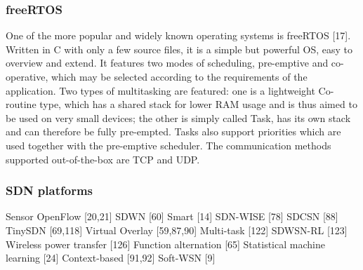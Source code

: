 \subsubsection{freeRTOS}

One of the more popular and widely known operating systems is freeRTOS [17].
Written in C with only a few source files,
	it is a simple but powerful OS,
	easy to overview and extend.
It features two modes of scheduling,
	pre-emptive and co-operative,
	which may be selected according to the requirements of the application.
Two types of multitasking are featured:
	one is a lightweight Co-routine type,
	which has a shared stack for lower RAM usage and is thus aimed to be used on very small devices;
	the other is simply called Task,
	has its own stack and can therefore be fully pre-empted.
Tasks also support priorities which are used together with the pre-emptive scheduler.
The communication methods supported out-of-the-box are TCP and UDP.

\subsubsection{SDN platforms}

Sensor OpenFlow [20,21]
SDWN [60]
Smart [14]
SDN-WISE [78]
SDCSN [88]
TinySDN [69,118]
Virtual Overlay [59,87,90]
Multi-task [122]
SDWSN-RL [123]
Wireless power transfer [126]
Function alternation [65]
Statistical machine learning [24]
Context-based [91,92]
Soft-WSN [9]

